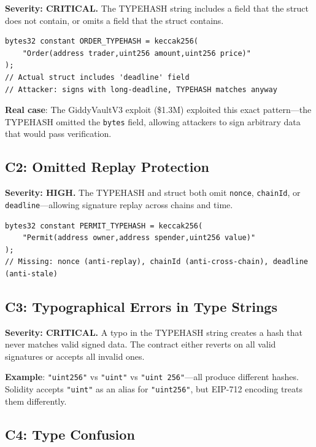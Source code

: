 \documentclass[conference]{IEEEtran}
\begin{document}
\textbf{Severity: CRITICAL.} The TYPEHASH string includes a field that the struct does not contain, or omits a field that the struct contains.

\begin{lstlisting}[caption={VULNERABLE: TYPEHASH excludes critical field},label=lst:c1]
bytes32 constant ORDER_TYPEHASH = keccak256(
    "Order(address trader,uint256 amount,uint256 price)"
);
// Actual struct includes 'deadline' field
// Attacker: signs with long-deadline, TYPEHASH matches anyway
\end{lstlisting}

\textbf{Real case}: The GiddyVaultV3 exploit (\$1.3M) exploited this exact pattern---the TYPEHASH omitted the \texttt{bytes} field, allowing attackers to sign arbitrary data that would pass verification.

\subsection{C2: Omitted Replay Protection}

\textbf{Severity: HIGH.} The TYPEHASH and struct both omit \texttt{nonce}, \texttt{chainId}, or \texttt{deadline}---allowing signature replay across chains and time.

\begin{lstlisting}[caption={VULNERABLE: No nonce or chainId},label=lst:c2]
bytes32 constant PERMIT_TYPEHASH = keccak256(
    "Permit(address owner,address spender,uint256 value)"
);
// Missing: nonce (anti-replay), chainId (anti-cross-chain), deadline (anti-stale)
\end{lstlisting}

\subsection{C3: Typographical Errors in Type Strings}

\textbf{Severity: CRITICAL.} A typo in the TYPEHASH string creates a hash that never matches valid signed data. The contract either reverts on all valid signatures or accepts all invalid ones.

\textbf{Example}: \texttt{"uint256"} vs \texttt{"uint"} vs \texttt{"uint 256"}---all produce different hashes. Solidity accepts \texttt{"uint"} as an alias for \texttt{"uint256"}, but EIP-712 encoding treats them differently.

\subsection{C4: Type Confusion}
\end{document}
